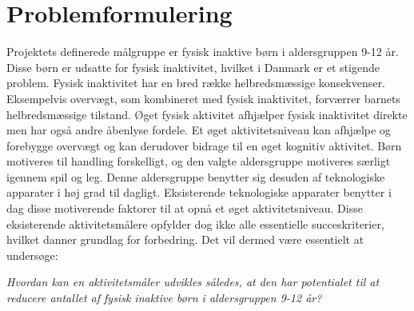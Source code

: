 \newpage \section{Problemformulering}\label{Problemformulering}
Projektets definerede målgruppe er fysisk inaktive børn i aldersgruppen 9-12 år. Disse børn er udsatte for fysisk inaktivitet, hvilket i Danmark er et stigende problem. Fysisk inaktivitet har en bred række helbredsmæssige konsekvenser. Eksempelvis overvægt, som kombineret med fysisk inaktivitet, forværrer barnets helbredsmæssige tilstand. Øget fysisk aktivitet afhjælper fysisk inaktivitet direkte men har også andre åbenlyse fordele. Et øget aktivitetsniveau kan afhjælpe og forebygge overvægt og kan derudover bidrage til en øget kognitiv aktivitet. Børn motiveres til handling forskelligt, og den valgte aldersgruppe motiveres særligt igennem spil og leg. Denne aldersgruppe benytter sig desuden af teknologiske apparater i høj grad til dagligt. %
Eksisterende teknologiske apparater benytter i dag disse motiverende faktorer til at opnå et øget aktivitetsniveau. Disse eksisterende aktivitetsmålere opfylder dog ikke alle essentielle succeskriterier, hvilket danner grundlag for forbedring. Det vil dermed være essentielt at undersøge:


\begin{center}
\textit{Hvordan kan en aktivitetsmåler udvikles således, at den har potentialet til at reducere antallet af fysisk inaktive børn i aldersgruppen 9-12 år?}
\end{center}

%
%	


